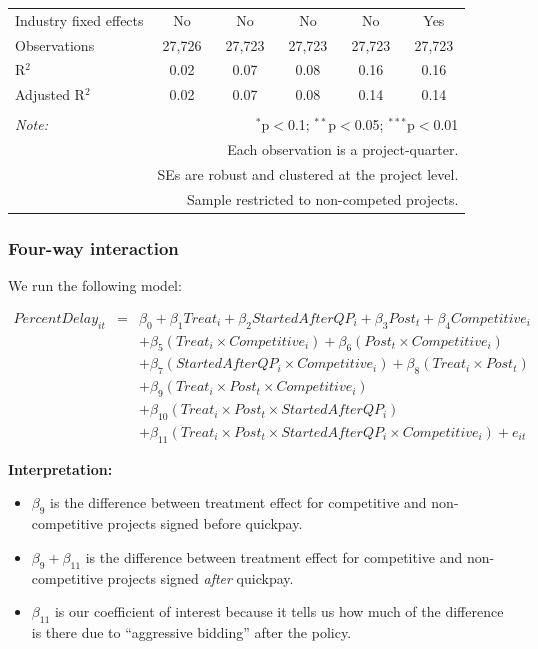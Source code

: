 \documentclass[
]{article}
\providecommand{\tightlist}{%
  \setlength{\itemsep}{0pt}\setlength{\parskip}{0pt}}
\begin{document}
\begin{table}[H]
\begin{tabular}{@{\extracolsep{-2pt}}lccccc}
Industry fixed effects & No & No & No & No & Yes \\ 
Observations & 27,726 & 27,723 & 27,723 & 27,723 & 27,723 \\ 
R$^{2}$ & 0.02 & 0.07 & 0.08 & 0.16 & 0.16 \\ 
Adjusted R$^{2}$ & 0.02 & 0.07 & 0.08 & 0.14 & 0.14 \\ 
\hline 
\hline \\[-1.8ex] 
\textit{Note:}  & \multicolumn{5}{r}{$^{*}$p$<$0.1; $^{**}$p$<$0.05; $^{***}$p$<$0.01} \\ 
 & \multicolumn{5}{r}{Each observation is a project-quarter.} \\ 
 & \multicolumn{5}{r}{SEs are robust and clustered at the project level.} \\ 
 & \multicolumn{5}{r}{Sample restricted to non-competed projects.} \\ 
\end{tabular} 
\end{table}

\hypertarget{four-way-interaction}{%
\subsubsection{Four-way interaction}\label{four-way-interaction}}

We run the following model:

\[\begin{aligned} PercentDelay_{it} &=& \beta_0 +\beta_1 Treat_i+ \beta_2 StartedAfterQP_i+ \beta_3 Post_t+ \beta_4 Competitive_i\\ && +  \beta_5 (Treat_i \times Competitive_i) + \beta_6 (Post_t \times Competitive_i)\\ && +  \beta_7 (StartedAfterQP_i \times Competitive_i) +\beta_8 (Treat_i \times Post_t)\\ && + \beta_9 (Treat_i \times Post_t \times Competitive_i) \\ && + \beta_{10} (Treat_i \times Post_t \times StartedAfterQP_i )\\ && + \beta_{11} (Treat_i \times Post_t \times StartedAfterQP_i \times Competitive_i) + e_{it} \end{aligned}\]

\textbf{Interpretation:}

\begin{itemize}
\tightlist
\item
  \(\beta_9\) is the difference between treatment effect for competitive
  and non-competitive projects signed before quickpay.
\item
  \(\beta_9 + \beta_{11}\) is the difference between treatment effect
  for competitive and non-competitive projects signed \emph{after}
  quickpay.
\item
  \(\beta_{11}\) is our coefficient of interest because it tells us how
  much of the difference is there due to ``aggressive bidding'' after
  the policy.
\end{itemize}
\end{document}
